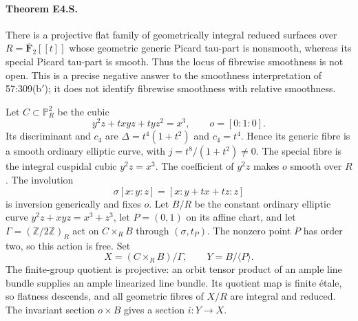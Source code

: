 \paragraph{Theorem E4.S.}
There is a projective flat family of geometrically integral reduced surfaces
over $R=\overline{\mathbf F}_2[[t]]$ whose geometric generic Picard
tau-part is nonsmooth, whereas its special Picard tau-part is smooth.
Thus the locus of fibrewise smoothness is not open. This is a precise
negative answer to the smoothness interpretation of 57:309(b$'$);
it does not identify fibrewise smoothness with relative smoothness.

Let $C\subset\mathbb P^2_R$ be the cubic
\[
 y^2z+txyz+tyz^2=x^3,\qquad o=[0:1:0].                 \tag{E4.S.1}
\]
Its discriminant and $c_4$ are
$\Delta=t^4(1+t^2)$ and $c_4=t^4$. Hence its generic fibre is a
smooth ordinary elliptic curve, with $j=t^8/(1+t^2)\ne0$.
The special fibre is the integral cuspidal cubic $y^2z=x^3$.
The coefficient of $y^2z$ makes $o$ smooth over $R$.
The involution
\[
 \sigma[x:y:z]=[x:y+tx+tz:z]                           \tag{E4.S.2}
\]
is inversion generically and fixes $o$.
Let $B/R$ be the constant ordinary elliptic curve
$y^2z+xyz=x^3+z^3$, let $P=(0,1)$ on its affine chart,
and let $\Gamma=(\mathbb Z/2\mathbb Z)_R$ act on $C\times_R B$
through $(\sigma,t_P)$. The nonzero point $P$ has order two, so this
action is free. Set
\[
 X=(C\times_R B)/\Gamma,\qquad Y=B/\langle P\rangle.
\]
The finite-group quotient is projective: an orbit tensor product of
an ample line bundle supplies an ample linearized line bundle.
Its quotient map is finite \'etale, so flatness descends, and all
geometric fibres of $X/R$ are integral and reduced. The invariant
section $o\times B$ gives a section $i:Y\to X$.

